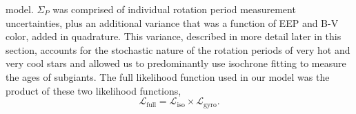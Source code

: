 model.
$\Sigma_P$ was comprised of individual rotation period measurement
uncertainties, plus an additional variance that was a function of EEP and B-V
color, added in quadrature.
This variance, described in more detail later in this section, accounts for
the stochastic nature of the rotation periods of very hot and very cool stars
and allowed us to predominantly use isochrone fitting to measure the ages of
subgiants.
The full likelihood function used in our model was the product of these two
likelihood functions,
\begin{equation}
    \mathcal{L}_{\mathrm{full}} = \mathcal{L}_{\mathrm{iso}} \times
    \mathcal{L}_{\mathrm{gyro}}.
\end{equation}


